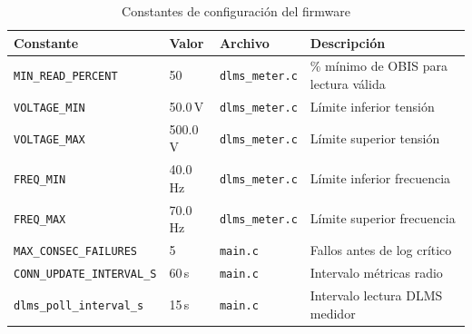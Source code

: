 \begin{table}[htbp]
\centering
\caption{Constantes de configuración del firmware}
\label{tab:constants}
\begin{tabular}{@{}llll@{}}
\toprule
\textbf{Constante} & \textbf{Valor} & \textbf{Archivo} & \textbf{Descripción} \\
\midrule
\texttt{MIN\_READ\_PERCENT}       & 50         & \texttt{dlms\_meter.c} & \% mínimo de OBIS para lectura válida \\
\texttt{VOLTAGE\_MIN}             & 50.0\,V    & \texttt{dlms\_meter.c} & Límite inferior tensión \\
\texttt{VOLTAGE\_MAX}             & 500.0\,V   & \texttt{dlms\_meter.c} & Límite superior tensión \\
\texttt{FREQ\_MIN}                & 40.0\,Hz   & \texttt{dlms\_meter.c} & Límite inferior frecuencia \\
\texttt{FREQ\_MAX}                & 70.0\,Hz   & \texttt{dlms\_meter.c} & Límite superior frecuencia \\
\texttt{MAX\_CONSEC\_FAILURES}    & 5          & \texttt{main.c}        & Fallos antes de log crítico \\
\texttt{CONN\_UPDATE\_INTERVAL\_S}& 60\,s      & \texttt{main.c}        & Intervalo métricas radio \\
\texttt{dlms\_poll\_interval\_s}  & 15\,s      & \texttt{main.c}        & Intervalo lectura DLMS medidor \\
\bottomrule
\end{tabular}
\end{table}
